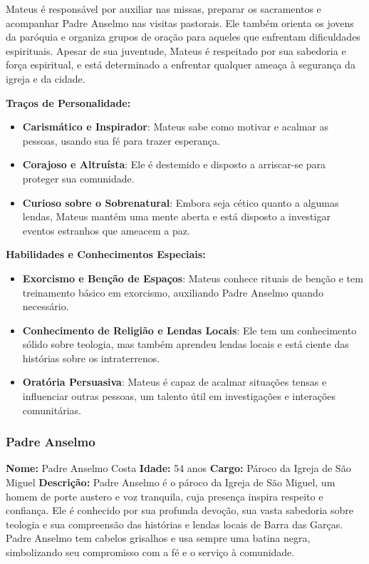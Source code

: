 Mateus é responsável por auxiliar nas missas, preparar os sacramentos e acompanhar Padre Anselmo nas visitas pastorais. Ele também orienta os jovens da paróquia e organiza grupos de oração para aqueles que enfrentam dificuldades espirituais. Apesar de sua juventude, Mateus é respeitado por sua sabedoria e força espiritual, e está determinado a enfrentar qualquer ameaça à segurança da igreja e da cidade.

\textbf{Traços de Personalidade:}
\begin{itemize}
    \item \textbf{Carismático e Inspirador}: Mateus sabe como motivar e acalmar as pessoas, usando sua fé para trazer esperança.
    \item \textbf{Corajoso e Altruísta}: Ele é destemido e disposto a arriscar-se para proteger sua comunidade.
    \item \textbf{Curioso sobre o Sobrenatural}: Embora seja cético quanto a algumas lendas, Mateus mantém uma mente aberta e está disposto a investigar eventos estranhos que ameacem a paz.
\end{itemize}

\textbf{Habilidades e Conhecimentos Especiais:}
\begin{itemize}
    \item \textbf{Exorcismo e Benção de Espaços}: Mateus conhece rituais de benção e tem treinamento básico em exorcismo, auxiliando Padre Anselmo quando necessário.
    \item \textbf{Conhecimento de Religião e Lendas Locais}: Ele tem um conhecimento sólido sobre teologia, mas também aprendeu lendas locais e está ciente das histórias sobre os intraterrenos.
    \item \textbf{Oratória Persuasiva}: Mateus é capaz de acalmar situações tensas e influenciar outras pessoas, um talento útil em investigações e interações comunitárias.
\end{itemize}

\subsubsection{Padre Anselmo}

\textbf{Nome:} Padre Anselmo Costa  
\textbf{Idade:} 54 anos  
\textbf{Cargo:} Pároco da Igreja de São Miguel  
\textbf{Descrição:}  
Padre Anselmo é o pároco da Igreja de São Miguel, um homem de porte austero e voz tranquila, cuja presença inspira respeito e confiança. Ele é conhecido por sua profunda devoção, sua vasta sabedoria sobre teologia e sua compreensão das histórias e lendas locais de Barra das Garças. Padre Anselmo tem cabelos grisalhos e usa sempre uma batina negra, simbolizando seu compromisso com a fé e o serviço à comunidade.

